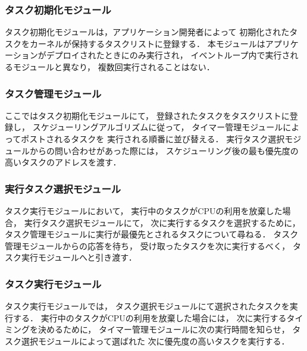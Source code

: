 \subsubsection{タスク初期化モジュール}

\vspace{0.5em}タスク初期化モジュールは，アプリケーション開発者によって
初期化されたタスクをカーネルが保持するタスクリストに登録する．
本モジュールはアプリケーションがデプロイされたときにのみ実行され，
イベントループ内で実行されるモジュールと異なり，
複数回実行されることはない．



\subsubsection{タスク管理モジュール}

\vspace{0.5em}ここではタスク初期化モジュールにて，
登録されたタスクをタスクリストに登録し，
スケジューリングアルゴリズムに従って，
タイマー管理モジュールによってポストされるタスクを
実行される順番に並び替える．
実行タスク選択モジュールからの問い合わせがあった際には，
スケジューリング後の最も優先度の高いタスクのアドレスを渡す．



\subsubsection{実行タスク選択モジュール}

\vspace{0.5em}タスク実行モジュールにおいて，
実行中のタスクがCPUの利用を放棄した場合，
実行タスク選択モジュールにて，
次に実行するタスクを選択するために，
タスク管理モジュールに実行が最優先とされるタスクについて尋ねる．
タスク管理モジュールからの応答を待ち，
受け取ったタスクを次に実行するべく，
タスク実行モジュールへと引き渡す．



\subsubsection{タスク実行モジュール}

\vspace{0.5em}タスク実行モジュールでは，
タスク選択モジュールにて選択されたタスクを実行する．
実行中のタスクがCPUの利用を放棄した場合には，
次に実行するタイミングを決めるために，
タイマー管理モジュールに次の実行時間を知らせ，
タスク選択モジュールによって選ばれた
次に優先度の高いタスクを実行する．



